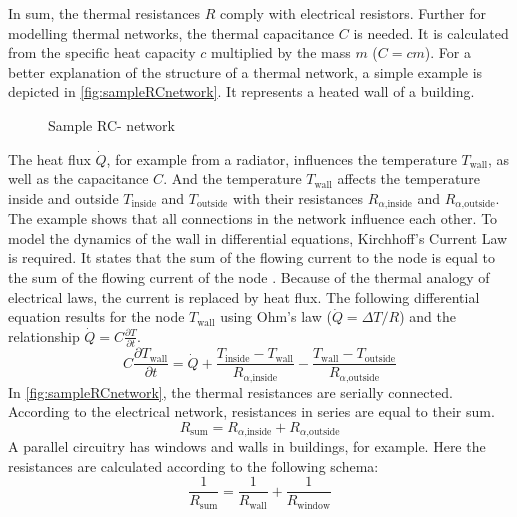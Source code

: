     In sum, the thermal resistances $R$ comply with electrical resistors.
    Further for modelling thermal networks, the thermal capacitance $C$ is needed. It is calculated from the specific heat capacity $c$ multiplied by the mass $m$ ($C=cm$).
    \newline
    For a better explanation of the structure of a thermal network, a simple example is depicted in \autoref{fig:sampleRCnetwork}. It represents a heated wall of a building.
    \begin{figure}[h]
    \centering
    \def\svgwidth{300pt}
    
    \caption{Sample RC- network}
    \label{fig:sampleRCnetwork}
    \end{figure}
    The heat flux $\dot{Q}$, for example from a radiator, influences the temperature $T_\text{wall}$, as well as the capacitance $C$. And the temperature $T_\text{wall}$ affects the temperature inside and outside $T_\text{inside}$ and $T_\text{outside}$ with their resistances $R_{\alpha \text{,inside}}$ and $R_{\alpha \text{,outside}}$. The example shows that all connections in the network influence each other.
    To model the dynamics of the wall in differential equations, Kirchhoff's Current Law is required. It states that the sum of the flowing current to the node is equal to the sum of the flowing current of the node 
    \cite{Kuchling.2007}. 
    Because of the thermal analogy of electrical laws, the current is replaced by heat flux. The following differential equation results for the node  $T_\text{wall}$ using Ohm's law ($\dot{Q}=\Delta T/R$) and the relationship $\dot{Q}=C\frac{\partial T}{\partial t}$.     
    \begin{equation}
    \label{eq:sampledifferential}
    C \frac{\partial T_\text{wall}}{\partial t} = \dot{Q} + \frac{T_\text{inside}-T_\text{wall}}{R_{\alpha \text{,inside}}} - \frac{T_\text{wall}-T_\text{outside}}{R_{\alpha\text{,outside}}}
    \end{equation}
    In \autoref{fig:sampleRCnetwork}, the thermal resistances are serially connected. According to the electrical network, resistances in series are equal to their sum. 
    \begin{equation}
    \label{eq:resistanceseriel}
        R_\text{sum} = R_{\alpha \text{,inside}} + R_{\alpha \text{,outside}}
    \end{equation}
    A parallel circuitry has windows and walls in buildings, for example. Here the resistances are calculated according to the following schema:
    \begin{equation}
    \label{eq:resistancesparallel}
        \frac{1}{R_\text{sum}} = \frac{1}{R_\text{wall}} + \frac{1}{R_\text{window}}
    \end{equation}
